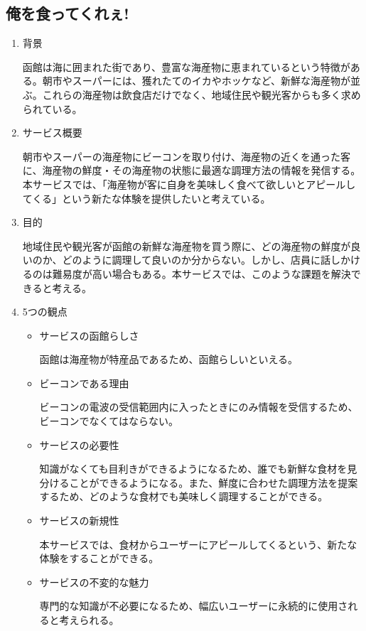 \subsection{俺を食ってくれぇ!}
\begin{enumerate}
    \item 背景
    \par 函館は海に囲まれた街であり、豊富な海産物に恵まれているという特徴がある。朝市やスーパーには、獲れたてのイカやホッケなど、新鮮な海産物が並ぶ。これらの海産物は飲食店だけでなく、地域住民や観光客からも多く求められている。
    \item サービス概要
    \par 朝市やスーパーの海産物にビーコンを取り付け、海産物の近くを通った客に、海産物の鮮度・その海産物の状態に最適な調理方法の情報を発信する。本サービスでは、「海産物が客に自身を美味しく食べて欲しいとアピールしてくる」という新たな体験を提供したいと考えている。
    \item 目的
    \par 地域住民や観光客が函館の新鮮な海産物を買う際に、どの海産物の鮮度が良いのか、どのように調理して良いのか分からない。しかし、店員に話しかけるのは難易度が高い場合もある。本サービスでは、このような課題を解決できると考える。
    \item 5つの観点
    \begin{itemize}
       \item サービスの函館らしさ
        \par 函館は海産物が特産品であるため、函館らしいといえる。
        \item ビーコンである理由
        \par ビーコンの電波の受信範囲内に入ったときにのみ情報を受信するため、ビーコンでなくてはならない。
        \item サービスの必要性
        \par 知識がなくても目利きができるようになるため、誰でも新鮮な食材を見分けることができるようになる。また、鮮度に合わせた調理方法を提案するため、どのような食材でも美味しく調理することができる。
        \item サービスの新規性
        \par 本サービスでは、食材からユーザーにアピールしてくるという、新たな体験をすることができる。
        \item サービスの不変的な魅力
        \par 専門的な知識が不必要になるため、幅広いユーザーに永続的に使用されると考えられる。
    \end{itemize}
\end{enumerate}

